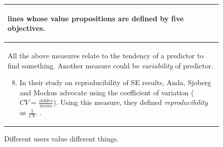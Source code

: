 \documentclass[sigconf,anonymous,review]{acmart}
\begin{document}
\begin{figure}[b]
\begin{tabular}{p{.95\linewidth}}
\begin{enumerate}[leftmargin=0.4cm]
lines whose value propositions are defined by five objectives.
\end{enumerate}
\\ \hline
\rowcolor{gray!10}
All the above measures relate to the tendency of a predictor to find something. Another measure could be {\em variability} of predictor.
\begin{enumerate}[leftmargin=0.4cm]
\setcounter{enumi}{7}
\item
In their study on reproducibility of SE results,
 Anda, Sjoberg and Mockus advocate using the coefficient of variation ($CV=\frac{stddev}{mean}$).
Using this measure, they defined {\em reproducibility} as $\frac{1}{CV}$~\cite{mockus09}.
\end{enumerate}\\\hline
\end{tabular}
\caption[Different users value different things.]{Different users value different things.
}\label{fig:goals}
\end{figure}

 


\end{document}
